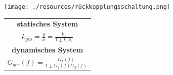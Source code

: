 \documentclass[12pt,a4paper]{article}
\begin{document}
\begin{minipage}{\linewidth}
\centering
\begin{minipage}{0.45\linewidth}
\begin{figure}[H]
\texttt{[image: ./resources/rückkopplungsschaltung.png]}
\end{figure}
\end{minipage}
\hspace{0.05\linewidth}
\begin{minipage}{0.45\linewidth}
\begin{figure}[H]
\begin{tabular}{|c|}
\hline
\textbf{statisches System}\\
$\displaystyle k_{ges} = \frac{y}{x} = \frac{k_1}{1 \pm k_1 k_2}$\\
\hline
\textbf{dynamisches System}\\
$\displaystyle G_{ges}(f) = \frac{G_1(f)}{1 \pm G_1(f)G_2(f)}$\\
\hline
\end{tabular}
\end{figure}
\end{minipage}
\end{minipage}
\end{document}
